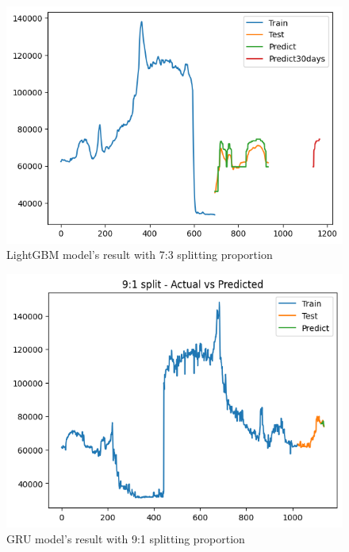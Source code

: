 \documentclass{ieeeojies}
\begin{document}
\begin{figure}[H]
  \centering
  \begin{minipage}{0.8\linewidth}
    \centering
    \includegraphics[width=\linewidth]{bibliography/Figure/LightGBM_DP3(7_3).png}
    \caption{LightGBM model's result with 7:3 splitting proportion}
    \label{fig8}
  \end{minipage}
\end{figure}

\begin{figure}[H]
  \centering
  \begin{minipage}{0.8\linewidth}
    \centering
    \includegraphics[width=\linewidth]{bibliography/Figure/DP3_GRU.png}
    \caption{GRU model's result with 9:1 splitting proportion}
    \label{fig8}
  \end{minipage}
\end{figure}
\end{document}
